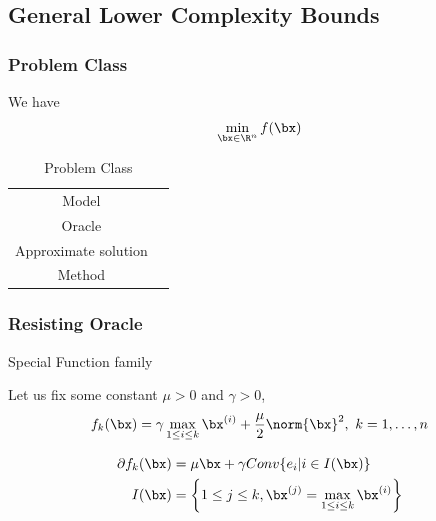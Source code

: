\subsection{General Lower Complexity Bounds}

\subsubsection{Problem Class}
We have 
\begin{align*}
    \min_{\bx\in\R^n}f(\bx)
\end{align*}

\begin{table}[H]%
    \centering
    \caption{Problem Class}
    \begin{tabular}[c]{cc}\toprule
        Model & \\ \cmidrule{1-1}
        Oracle & \\ \cmidrule{1-1}
        Approximate solution & \\ \cmidrule{1-1}
        Method & \\ 
        \bottomrule
    \end{tabular}
\end{table}


\subsubsection{Resisting Oracle}
Special Function family

Let us fix some constant $\mu>0$ and $\gamma>0$, 
\begin{align*}
    f_k(\bx)=\gamma \max_{1\le i\le k}\bx^{(i)}+\frac{\mu}{2}\norm{\bx}^2,\ k=1,\dots,n
\end{align*}

\begin{align*}
    \partial f_k(\bx)&=\mu\bx+\gamma Conv\{ e_i|i\in I(\bx) \}\\
    I(\bx)&=\left\{ 1\le j\le k, \bx^{(j)}=\max_{1\le i\le k}\bx^{(i)} \right\}
\end{align*}


